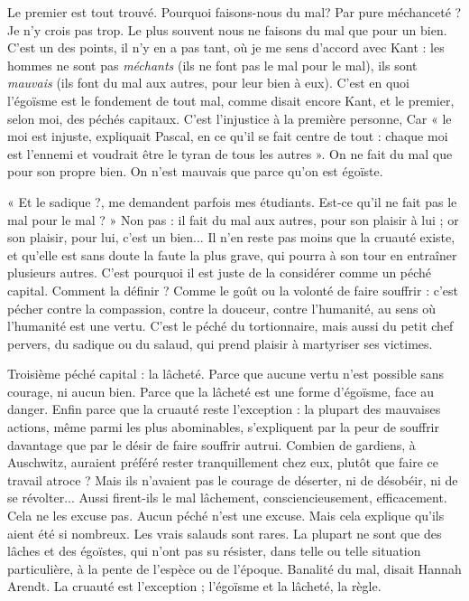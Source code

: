 Le premier est tout trouvé. Pourquoi faisons-nous du mal? Par pure
méchanceté ? Je n’y crois pas trop. Le plus souvent nous ne faisons du mal que
pour un bien. C’est un des points, il n’y en a pas tant, où je me sens d’accord
avec Kant : les hommes ne sont pas {\it méchants} (ils ne font pas le mal pour le
mal), ils sont {\it mauvais} (ils font du mal aux autres, pour leur bien à eux). C’est
en quoi l’égoïsme est le fondement de tout mal, comme disait encore Kant, et
le premier, selon moi, des péchés capitaux. C’est l’injustice à la première personne,
Car « le moi est injuste, expliquait Pascal, en ce qu’il se fait centre de
tout : chaque moi est l’ennemi et voudrait être le tyran de tous les autres ». On
ne fait du mal que pour son propre bien. On n’est mauvais que parce qu’on est
égoïste.

« Et le sadique ?, me demandent parfois mes étudiants. Est-ce qu’il ne fait
pas le mal pour le mal ? » Non pas : il fait du mal aux autres, pour son plaisir à
lui ; or son plaisir, pour lui, c’est un bien... Il n’en reste pas moins que la
cruauté existe, et qu’elle est sans doute la faute la plus grave, qui pourra à son
tour en entraîner plusieurs autres. C’est pourquoi il est juste de la considérer
comme un péché capital. Comment la définir ? Comme le goût ou la volonté
de faire souffrir : c’est pécher contre la compassion, contre la douceur, contre
l'humanité, au sens où l'humanité est une vertu. C’est le péché du tortionnaire,
mais aussi du petit chef pervers, du sadique ou du salaud, qui prend plaisir à
martyriser ses victimes.

Troisième péché capital : la lâcheté. Parce que aucune vertu n’est possible
sans courage, ni aucun bien. Parce que la lâcheté est une forme d’égoïsme, face
au danger. Enfin parce que la cruauté reste l'exception : la plupart des mauvaises
actions, même parmi les plus abominables, s’expliquent par la peur de
souffrir davantage que par le désir de faire souffrir autrui. Combien de gardiens,
à Auschwitz, auraient préféré rester tranquillement chez eux, plutôt que
faire ce travail atroce ? Mais ils n’avaient pas le courage de déserter, ni de désobéir,
ni de se révolter... Aussi firent-ils le mal lâchement, consciencieusement,
efficacement. Cela ne les excuse pas. Aucun péché n’est une excuse. Mais cela
explique qu'ils aient été si nombreux. Les vrais salauds sont rares. La plupart ne
sont que des lâches et des égoïstes, qui n’ont pas su résister, dans telle ou telle
situation particulière, à la pente de l’espèce ou de l’époque. Banalité du mal,
disait Hannah Arendt. La cruauté est l'exception ; l’égoïsme et la lâcheté, la
règle.

